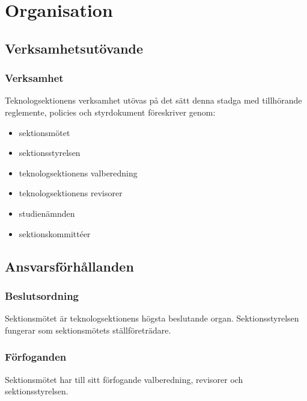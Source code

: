 \section{Organisation}

\subsection{Verksamhetsutövande}

\subsubsection{Verksamhet}
Teknologsektionens verksamhet utövas på det sätt denna stadga med tillhörande reglemente, policies och styrdokument föreskriver genom:

\begin{itemize}
	\item sektionsmötet
	\item sektionsstyrelsen \STYRIT{}
	\item teknologsektionens valberedning
	\item teknologsektionens revisorer
	\item studienämnden \SNIT{}
	\item sektionskommittéer
\end{itemize}

\subsection{Ansvarsförhållanden}

\subsubsection{Beslutsordning}
Sektionsmötet är teknologsektionens högsta beslutande organ. Sektionsstyrelsen fungerar som sektionsmötets ställföreträdare.

\subsubsection{Förfoganden}
Sektionsmötet har till sitt förfogande valberedning, revisorer och sektionsstyrelsen.

